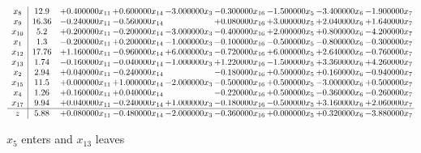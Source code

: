 \documentclass[10pt]{article}
\begin{document}
 \[\begin{array}{c| c c@{\hskip 2pt} c@{\hskip 2pt} c@{\hskip 2pt} c@{\hskip 2pt} c@{\hskip 2pt} c@{\hskip 2pt} c@{\hskip 2pt} }
 x_{8}   &  12.9 & + 0.400000 x_{11} & + 0.600000 x_{14} & -3.000000 x_{3} & -0.300000 x_{16} & -1.500000 x_{5} & -3.400000 x_{6} & -1.900000 x_{7}\\
 x_{9}   &  16.36 & -0.240000 x_{11} & -0.560000 x_{14} &   & + 0.080000 x_{16} & + 3.000000 x_{5} & + 2.040000 x_{6} & + 1.640000 x_{7}\\
 x_{10}   &  5.2 & + 0.200000 x_{11} & -0.200000 x_{14} & -3.000000 x_{3} & -0.400000 x_{16} & + 2.000000 x_{5} & + 0.800000 x_{6} & -4.200000 x_{7}\\
 x_{1}   &  1.3 & -0.200000 x_{11} & + 0.200000 x_{14} & -1.000000 x_{3} & -0.100000 x_{16} & -0.500000 x_{5} & -0.800000 x_{6} & -0.300000 x_{7}\\
 x_{12}   &  17.76 & + 1.160000 x_{11} & -0.960000 x_{14} & + 6.000000 x_{3} & -0.720000 x_{16} & + 6.000000 x_{5} & + 2.640000 x_{6} & -0.760000 x_{7}\\
 x_{13}   &  1.74 & -0.160000 x_{11} & -0.040000 x_{14} & -1.000000 x_{3} & + 1.220000 x_{16} & -1.500000 x_{5} & + 3.360000 x_{6} & + 4.260000 x_{7}\\
 x_{2}   &  2.94 & + 0.040000 x_{11} & -0.240000 x_{14} &   & -0.180000 x_{16} & + 0.500000 x_{5} & + 0.160000 x_{6} & -0.940000 x_{7}\\
 x_{15}   &  11.5 & + 0.000000 x_{11} & + 1.000000 x_{14} & -2.000000 x_{3} & -0.500000 x_{16} & + 0.500000 x_{5} & -3.000000 x_{6} & + 0.500000 x_{7}\\
 x_{4}   &  1.26 & + 0.160000 x_{11} & + 0.040000 x_{14} &   & -0.220000 x_{16} & + 0.500000 x_{5} & -0.360000 x_{6} & -0.260000 x_{7}\\
 x_{17}   &  9.94 & + 0.040000 x_{11} & -0.240000 x_{14} & + 1.000000 x_{3} & -0.180000 x_{16} & -0.500000 x_{5} & + 3.160000 x_{6} & + 2.060000 x_{7}\\
\hline
z    &  5.88 & + 0.080000 x_{11} & -0.480000 x_{14} & -2.000000 x_{3} & -0.360000 x_{16} & + 0.000000 x_{5} & + 0.320000 x_{6} & -3.880000 x_{7}\\
\end{array}\]


 $ x_{5} $ enters and $ x_{13} $ leaves 
\end{document}
